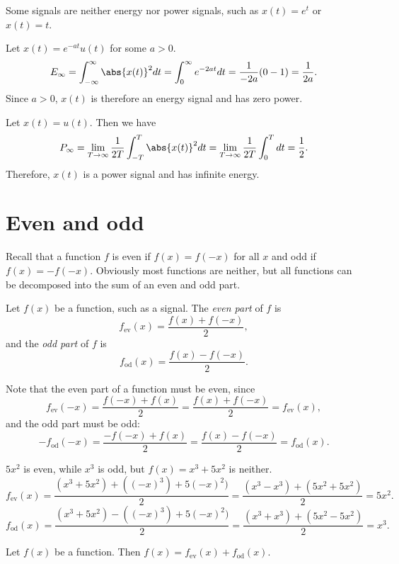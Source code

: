 \documentclass[12pt]{article}
\begin{document}
Some signals are neither energy nor power signals, such as $x(t) = e^t$ or $x(t) = t$.

\begin{exmp}
    Let $x(t) = e^{-at}u(t)$ for some $a > 0$.
    \[E_{\infty} = \int_{-\infty}^{\infty}\abs{x(t)}^2dt = \int_{0}^{\infty}e^{-2at}dt = \frac{1}{-2a}(0 - 1) = \frac{1}{2a}.\] Since $a > 0$, $x(t)$ is therefore an energy signal and has zero power.
\end{exmp}

\begin{exmp}
    Let $x(t) = u(t)$. Then we have
    \[P_{\infty} = \lim_{T\to\infty}\frac{1}{2T}\int_{-T}^{T}\abs{x(t)}^2dt = \lim_{T\to\infty}\frac{1}{2T}\int_{0}^{T}dt = \frac{1}{2}.\] Therefore, $x(t)$ is a power signal and has infinite energy.
\end{exmp}

\section{Even and odd}

Recall that a function $f$ is even if $f(x) = f(-x)$ for all $x$ and odd if $f(x) = -f(-x)$. Obviously most functions are neither, but all functions can be decomposed into the sum of an even and odd part.

\begin{defn}
    Let $f(x)$ be a function, such as a signal. The \emph{even part} of $f$ is \[f_{\mathrm{ev}}(x) = \frac{f(x) + f(-x)}{2},\] and the \emph{odd part} of $f$ is \[f_{\mathrm{od}}(x) = \frac{f(x) - f(-x)}{2}.\]
\end{defn}

Note that the even part of a function must be even, since \[f_{\mathrm{ev}}(-x) = \frac{f(-x) + f(x)}{2} = \frac{f(x) + f(-x)}{2} = f_{\mathrm{ev}}(x),\] and the odd part must be odd: \[-f_{\mathrm{od}}(-x) = \frac{-f(-x)+f(x)}{2} = \frac{f(x) - f(-x)}{2} = f_{\mathrm{od}}(x).\]

\begin{exmp}
    $5x^2$ is even, while $x^3$ is odd, but $f(x) = x^3 + 5x^2$ is neither. \[f_{\mathrm{ev}}(x) = \frac{(x^3 + 5x^2) + ((-x)^3) + 5(-x)^2)}{2} = \frac{(x^3 - x^3) + (5x^2 + 5x^2)}{2} = 5x^2.\]
    \[f_{\mathrm{od}}(x) = \frac{(x^3 + 5x^2) - ((-x)^3) + 5(-x)^2)}{2} = \frac{(x^3 + x^3) + (5x^2 - 5x^2)}{2} = x^3.\]
\end{exmp}

\begin{prop}
    Let $f(x)$ be a function. Then $f(x) = f_{\mathrm{ev}}(x) + f_{\mathrm{od}}(x)$.
\end{prop}
\end{document}

